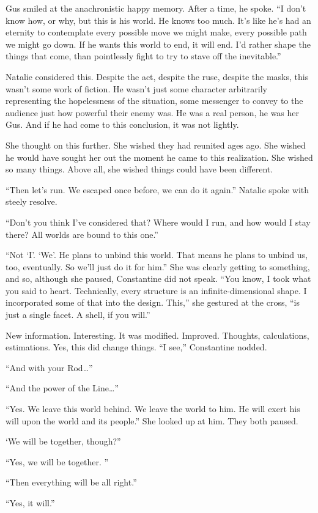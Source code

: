 Gus smiled at the anachronistic happy memory. After a time, he spoke. “I don’t know how, or why, but this is his world. He knows too much. It’s like he’s had an eternity to contemplate every possible move we might make, every possible path we might go down. If he wants this world to end, it will end. I’d rather shape the things that come, than pointlessly fight to try to stave off the inevitable.”

Natalie considered this. Despite the act, despite the ruse, despite the masks, this wasn’t some work of fiction. He wasn’t just some character arbitrarily representing the hopelessness of the situation, some messenger to convey to the audience just how powerful their enemy was. He was a real person, he was her Gus. And if he had come to this conclusion, it was not lightly.

She thought on this further. She wished they had reunited ages ago. She wished he would have sought her out the moment he came to this realization. She wished so many things. Above all, she wished things could have been different.

“Then let’s run. We escaped once before, we can do it again.” Natalie spoke with steely resolve.

“Don’t you think I’ve considered that? Where would I run, and how would I stay there? All worlds are bound to this one.”

“Not ‘I’. ‘We’. He plans to unbind this world. That means he plans to unbind us, too, eventually. So we’ll just do it for him.” She was clearly getting to something, and so, although she paused, Constantine did not speak. “You know, I took what you said to heart. Technically, every structure is an infinite-dimensional shape. I incorporated some of that into the design. This,” she gestured at the cross, “is just a single facet. A shell, if you will.”

New information. Interesting. It was modified. Improved. Thoughts, calculations, estimations. Yes, this did change things. “I see,” Constantine nodded.

“And with your Rod…”

“And the power of the Line…”

“Yes. We leave this world behind. We leave the world to him. He will exert his will upon the world and its people.” She looked up at him. They both paused.

‘We will be together, though?”

“Yes, we will be together. ”

“Then everything will be all right.”

“Yes, it will.”
